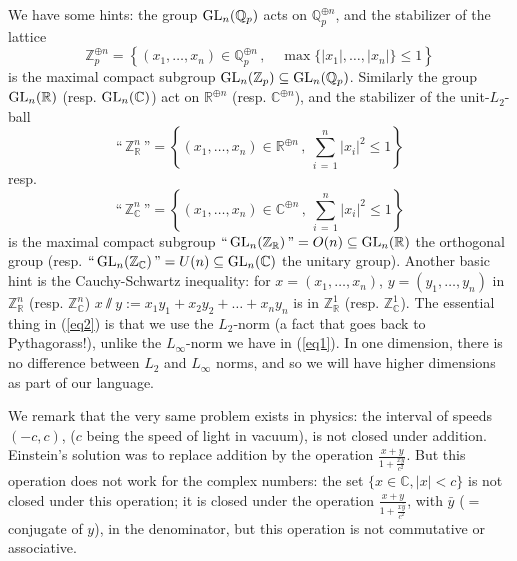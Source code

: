 \documentclass[leqno]{article}
\numberwithin{equation}{section}
\begin{document}
We have some hints: the group ${\rm GL}_n ({\mathbb Q}_p)$ acts on ${\mathbb Q}_p^{\oplus n}$, and the stabilizer of the lattice
\begin{equation}
\label{eq1}
{\mathbb Z}^{\oplus n}_p = \left\{ (x_1 , \ldots , x_n) \in {\mathbb Q}_p^{\oplus n} \, , \quad \max \{ \vert x_1 \vert , \ldots , \vert x_n \vert \} \leq 1 \right\}
\end{equation}
is the maximal compact subgroup ${\rm GL}_n ({\mathbb Z}_p) \subseteq {\rm GL}_n ({\mathbb Q}_p)$. Similarly the group ${\rm GL}_n ({\mathbb R})$ (resp. ${\rm GL}_n ({\mathbb C})$) act on ${\mathbb R}^{\oplus n}$ (resp. ${\mathbb C}^{\oplus n}$), and the stabilizer of the unit-$L_2$-ball
\begin{equation}
\label{eq2}
\mbox{``} \, {\mathbb Z}_{\mathbb R}^n \, \mbox{''} = \left\{ (x_1 , \ldots , x_n) \in {\mathbb R}^{\oplus n} \, , \ \sum_{i \, = \, 1}^n \vert x_i \vert^2 \leq 1 \right\}
\end{equation}
resp.
$$
\mbox{``} \, {\mathbb Z}_{\mathbb C}^n \, \mbox{''} = \left\{ (x_1 , \ldots , x_n) \in {\mathbb C}^{\oplus n} \, , \ \sum_{i \, = \, 1}^n \vert x_i \vert^2 \leq 1 \right\}
$$
is the maximal compact subgroup $\mbox{``} \, {\rm GL}_n ({\mathbb Z}_{\mathbb R}) \, \mbox{''} = O(n) \subseteq {\rm GL}_n ({\mathbb R})$ the orthogonal group (resp. $\mbox{``} \, {\rm GL}_n ({\mathbb Z}_{\mathbb C}) \, \mbox{''} = U(n) \subseteq {\rm GL}_n ({\mathbb C})$ the unitary group). Another basic hint is the Cauchy-Schwartz inequality: for $x = (x_1 , \ldots , x_n)$, $y = (y_1 , \ldots , y_n)$ in ${\mathbb Z}_{\mathbb R}^n$ (resp. ${\mathbb Z}_{\mathbb C}^n$) $x \sslash y := x_1 y_1 + x_2 y_2 + \ldots + x_n y_n$ is in ${\mathbb Z}_{\mathbb R}^1$ (resp. ${\mathbb Z}_{\mathbb C}^1$). The essential thing in (\ref{eq2}) is that we use the $L_2$-norm (a fact that goes back to Pythagorass!), unlike the $L_{\infty}$-norm we have in (\ref{eq1}). In one dimension, there is no difference between $L_2$ and $L_{\infty}$ norms, and so we will have higher dimensions as part of our language.

\smallskip

We remark that the very same problem exists in physics: the interval of speeds $(-c,c)$, ($c$ being the speed of light in vacuum), is not closed under addition. Einstein's solution was to replace addition by the operation $\frac{x+y}{1 + \frac{xy}{c^2}}$. But this operation does not work for the complex numbers: the set $\{ x \in {\mathbb C} , \vert x \vert < c \}$ is not closed under this operation; it is closed under the operation $\frac{x+y}{1+ \frac{x \bar y}{c^2}}$, with $\bar y$ ($=$ conjugate of $y$), in the denominator, but this operation is not commutative or associative.
\end{document}
